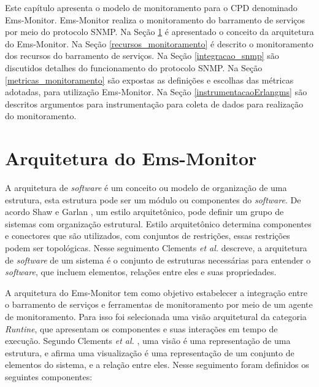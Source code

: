 \label{monitoramento_servicos}

Este capítulo apresenta o modelo de monitoramento para o \acrshort{CPD} denominado Ems-Monitor. Ems-Monitor realiza o monitoramento do barramento de serviços por meio do protocolo \acrshort{SNMP}. Na Seção \ref{arquitetura_monitoramento} é apresentado o conceito da arquitetura do Ems-Monitor. Na Seção \ref{recursos_monitoramento} é descrito o monitoramento dos recursos do barramento de serviços. Na Seção \ref{integracao_snmp} são discutidos detalhes do funcionamento do protocolo \acrshort{SNMP}. Na Seção \ref{metricas_monitoramento} são expostas as definições e escolhas das métricas adotadas, para utilização Ems-Monitor. Na Seção \ref{instrumentacaoErlangms} são descritos argumentos para instrumentação para coleta de dados para realização do monitoramento.

\section{Arquitetura do Ems-Monitor}%
\label{arquitetura_monitoramento}

A arquitetura de \textit{software} é um conceito ou modelo de organização de uma estrutura, esta estrutura pode ser um módulo ou componentes do \textit{software}. De acordo Shaw e Garlan \cite{garlan1993introduction}, um estilo arquitetônico, pode definir um grupo de sistemas com organização estrutural. Estilo arquitetônico determina componentes e conectores que são utilizados, com conjuntos de restrições, essas restrições podem ser topológicas. Nesse seguimento Clements \textit{et al.} \cite{clements2002documenting} descreve, a arquitetura de \textit{software} de um sistema é o conjunto de estruturas necessárias para entender o \textit{software}, que incluem elementos, relações entre eles e suas propriedades.

A arquitetura do Ems-Monitor tem como objetivo estabelecer a integração entre o barramento de serviços e ferramentas de monitoramento por meio de um agente de monitoramento. Para isso foi selecionada uma visão arquitetural da categoria \textit{Runtine}, que apresentam os componentes e suas interações em tempo de execução. Segundo Clements \textit{et al.} \cite{clements2002documenting}, uma visão é uma representação de uma estrutura, e afirma uma visualização é uma representação de um conjunto de elementos do sistema, e a relação entre eles. Nesse seguimento foram definidos os seguintes componentes:


